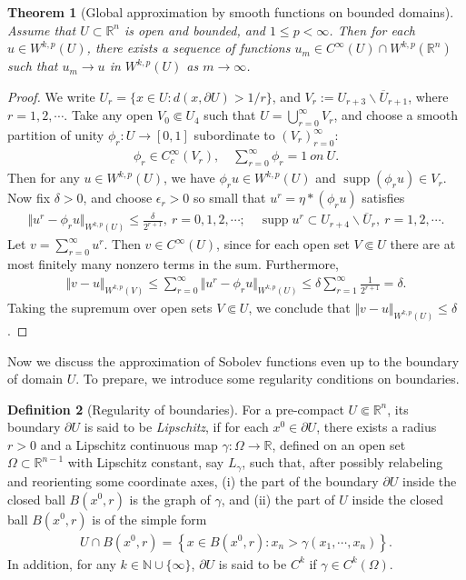 \documentclass{article}
\numberwithin{equation}{section}
\newcommand{\bbN}{\mathbb{N}}
\newcommand{\bbR}{\mathbb{R}}
\newcommand{\ol}{\overline}
\DeclareMathOperator{\supp}{supp}
\theoremstyle{plain}
\newtheorem{theorem}{Theorem}[section]
\theoremstyle{definition}
\newtheorem{definition}[theorem]{Definition}
\begin{document}
\begin{theorem}[Global approximation by smooth functions on bounded domains]\label{thm:2.11}
Assume that $U\subset\bbR^n$ is open and bounded, and $1\leq p<\infty$. Then for each $u\in W^{k,p}(U)$, there exists a sequence of functions $u_m\in C^\infty(U)\cap W^{k,p}(\bbR^n)$ such that $u_m\to u$ in $W^{k,p}(U)$ as $m\to\infty$.
\end{theorem}
\begin{proof}
We write $U_r=\{x\in U:d(x,\partial U)>1/r\}$, and $V_r:=U_{r+3}\backslash\ol{U}_{r+1}$, where $r=1,2,\cdots$. Take any open $V_0\Subset U_4$ such that $U=\bigcup_{r=0}^\infty V_r$, and choose a smooth partition of unity $\phi_r:U\to[0,1]$ subordinate to $(V_r)_{r=0}^\infty$:
\begin{align*}
\phi_r\in C_c^\infty(V_r),\quad \sum_{r=0}^\infty\phi_r=1\ \textit{on}\ U.
\end{align*}
Then for any $u\in W^{k,p}(U)$, we have $\phi_ru\in W^{k,p}(U)$ and $\supp(\phi_r u)\in V_r$. Now fix $\delta>0$, and choose $\epsilon_r>0$ so small that $u^r=\eta*(\phi_ru)$ satisfies
\begin{align*}
\Vert u^r-\phi_r u\Vert_{W^{k,p}(U)}\leq\frac{\delta}{2^{r+1}},\ r=0,1,2,\cdots;\quad \supp u^r\subset U_{r+4}\backslash\ol{U}_r,\  r=1,2,\cdots.
\end{align*}
Let $v=\sum_{r=0}^\infty u^r$. Then $v\in C^\infty(U)$, since for each open set $V\Subset U$ there are at most finitely many nonzero terms in the sum. Furthermore,
\begin{align*}
	\Vert v-u\Vert_{W^{k,p}(V)}\leq\sum_{r=0}^\infty\Vert u^r-\phi_r u\Vert_{W^{k,p}(U)}\leq\delta\sum_{r=1}^\infty\frac{1}{2^{r+1}}=\delta.
\end{align*}
Taking the supremum over open sets $V\Subset U$, we conclude that $\Vert v-u\Vert_{W^{k,p}(U)}\leq\delta$.
\end{proof}

Now we discuss the approximation of Sobolev functions even up to the boundary of domain $U$. To prepare, we introduce some regularity conditions on boundaries.

\begin{definition}[Regularity of boundaries]\label{boundaries}
For a pre-compact $U\Subset\bbR^n$, its boundary $\partial U$ is said to be \textit{Lipschitz}, if for each $x^0\in\partial U$, there exists a radius $r>0$ and a Lipschitz continuous map $\gamma:\Omega\to\bbR$, defined on an open set $\Omega\subset\bbR^{n-1}$ with Lipschitz constant, say $L_\gamma$, such that, after possibly relabeling and reorienting some coordinate axes, (i) the part of the boundary $\partial U$ inside the closed ball $B(x^0,r)$ is the graph of $\gamma$, and (ii) the part of $U$ inside the closed ball $B(x^0,r)$ is of the simple form
\begin{align*}
	U\cap B(x^0,r)=\left\{x\in B(x^0,r):x_n>\gamma(x_1,\cdots,x_n)\right\}.
\end{align*}
In addition, for any $k\in\bbN\cup\{\infty\}$, $\partial U$ is said to be $C^k$ if $\gamma\in C^k(\Omega)$.
\end{definition}
\end{document}
